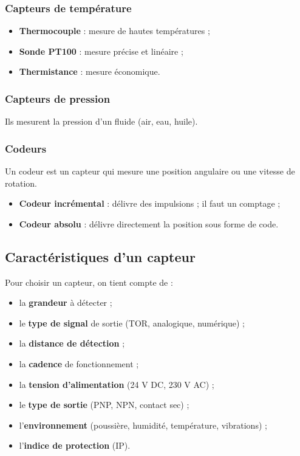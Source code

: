 \subsubsection{Capteurs de température}

\begin{itemize}
    \item \textbf{Thermocouple} : mesure de hautes températures ;
    \item \textbf{Sonde PT100} : mesure précise et linéaire ;
    \item \textbf{Thermistance} : mesure économique.
\end{itemize}

\subsubsection{Capteurs de pression}

Ils mesurent la pression d'un fluide (air, eau, huile).

\subsubsection{Codeurs}

Un codeur est un capteur qui mesure une position angulaire ou une vitesse de rotation.

\begin{itemize}
    \item \textbf{Codeur incrémental} : délivre des impulsions ; il faut un comptage ;
    \item \textbf{Codeur absolu} : délivre directement la position sous forme de code.
\end{itemize}

\subsection{Caractéristiques d'un capteur}

Pour choisir un capteur, on tient compte de :

\begin{itemize}
    \item la \textbf{grandeur} à détecter ;
    \item le \textbf{type de signal} de sortie (TOR, analogique, numérique) ;
    \item la \textbf{distance de détection} ;
    \item la \textbf{cadence} de fonctionnement ;
    \item la \textbf{tension d'alimentation} (24 V DC, 230 V AC) ;
    \item le \textbf{type de sortie} (PNP, NPN, contact sec) ;
    \item l'\textbf{environnement} (poussière, humidité, température, vibrations) ;
    \item l'\textbf{indice de protection} (IP).
\end{itemize}

